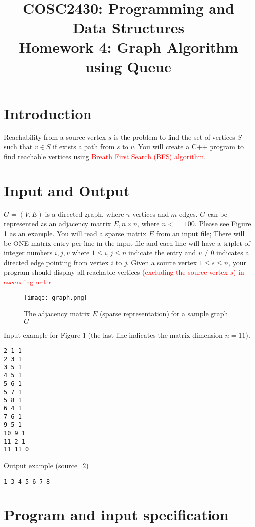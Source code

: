 \documentclass[times,11pt,verbatim,js-singlespace]{article}  %
\title{COSC2430: Programming and Data Structures\\
Homework 4: Graph Algorithm using Queue
}
\date{}
\begin{document}

\pagestyle{plain}
\let\thepage\relax  %

\maketitle

\section{Introduction}
Reachability from a source vertex $s$ is the problem to find the set of vertices $S$ such that $v \in S$ if exists a path from $s$ to $v$. You will create a C++ program to find reachable vertices using \textcolor{red}{Breath First Search (BFS) algorithm}. 
\section{Input and Output}
$G = (V, E)$ is a directed graph, where $n$ vertices and $m$ edges. $G$ can be represented as an adjacency matrix $E, n\times n$, where $n <= 100$. Please see Figure 1 as an example. You will read a sparse matrix $E$ from an input file; There will be ONE matrix entry per line in the input file and each line will have a triplet of integer numbers $i,j,v$ where $1 \le i,j \le n$ indicate the entry and $v\neq 0$ indicates a directed edge pointing from vertex $i$ to $j$. Given a source vertex $1 \le s \le n$, your program should display all reachable vertices \textcolor{red}{(excluding the source vertex $s$) in ascending order}. 
\begin{figure}[htbp]
\centering\texttt{[image: graph.png]}
\label{F:GraphAndE}
\caption{The adjacency matrix $E$  (sparse representation) for a sample graph $G$}
\end{figure}

Input example for Figure 1 (the last line indicates the matrix dimension $n = 11$).
\begin{verbatim}
2 1 1
2 3 1
3 5 1
4 5 1
5 6 1
5 7 1
5 8 1
6 4 1
7 6 1
9 5 1
10 9 1
11 2 1
11 11 0
\end{verbatim}

Output example (source=2)

\begin{verbatim}
1 3 4 5 6 7 8
\end{verbatim}

\section{Program and input specification}
\end{document}
